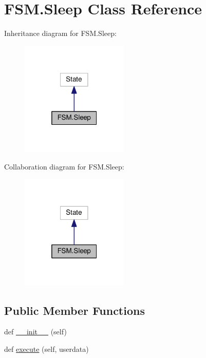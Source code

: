 \hypertarget{classFSM_1_1Sleep}{}\section{F\+S\+M.\+Sleep Class Reference}
\label{classFSM_1_1Sleep}


Inheritance diagram for F\+S\+M.\+Sleep\+:\nopagebreak
\begin{figure}[H]
\begin{center}
\leavevmode
\includegraphics[width=145pt]{classFSM_1_1Sleep__inherit__graph}
\end{center}
\end{figure}


Collaboration diagram for F\+S\+M.\+Sleep\+:\nopagebreak
\begin{figure}[H]
\begin{center}
\leavevmode
\includegraphics[width=145pt]{classFSM_1_1Sleep__coll__graph}
\end{center}
\end{figure}
\subsection*{Public Member Functions}
\begin{DoxyCompactItemize}
\item 
def \hyperlink{classFSM_1_1Sleep_a54af482c09a00a2c1624fba609c4f780}{\+\_\+\+\_\+init\+\_\+\+\_\+} (self)
\item 
def \hyperlink{classFSM_1_1Sleep_ad9e21d03aeeb758686055fb3ca68a639}{execute} (self, userdata)
\end{DoxyCompactItemize}
